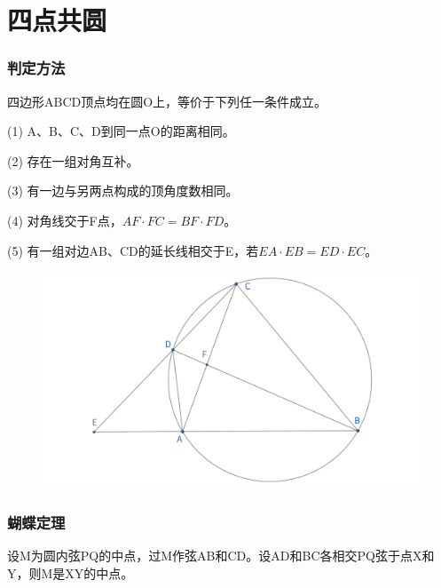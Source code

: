 \part{四点共圆}
\section{判定方法}
\begin{proposition}[四点共圆判定方法]
    四边形ABCD顶点均在圆O上，等价于下列任一条件成立。

    (1) A、B、C、D到同一点O的距离相同。

    (2) 存在一组对角互补。

    (3) 有一边与另两点构成的顶角度数相同。

    (4) 对角线交于F点，$AF\cdot FC = BF\cdot FD$。

    (5) 有一组对边AB、CD的延长线相交于E，若$EA\cdot EB = ED\cdot EC$。
\end{proposition}
\begin{figure}[H]
    \centering
    \includegraphics[width=\linewidth]{figures/四点共圆.png}
\end{figure}




\section{蝴蝶定理}
\begin{theorem}
    设M为圆内弦PQ的中点，过M作弦AB和CD。设AD和BC各相交PQ弦于点X和Y，则M是XY的中点。
\end{theorem}

